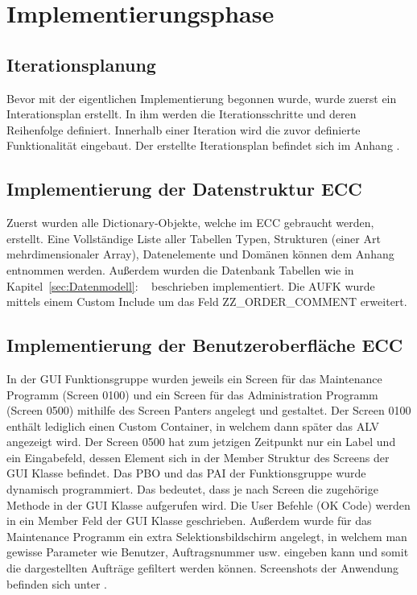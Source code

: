 \section{Implementierungsphase} 
\label{sec:Implementierungsphase}

\subsection{Iterationsplanung}
\label{sec:Iterationsplanung}
Bevor mit der eigentlichen Implementierung begonnen wurde, wurde zuerst ein Interationsplan erstellt. In ihm werden die Iterationsschritte und deren Reihenfolge definiert. Innerhalb einer Iteration wird die zuvor definierte Funktionalität eingebaut. Der erstellte Iterationsplan befindet sich im Anhang .

\subsection{Implementierung der Datenstruktur ECC}
\label{sec:Implementierung der Datenstruktur ECC}
Zuerst wurden alle Dictionary-Objekte, welche im \ac{ECC} gebraucht werden, erstellt. Eine Vollständige Liste aller Tabellen Typen, Strukturen (einer Art mehrdimensionaler Array), Datenelemente und Domänen können dem Anhang entnommen werden. Außerdem wurden die Datenbank Tabellen wie in Kapitel~\ref{sec:Datenmodell}: ~ beschrieben implementiert. Die AUFK wurde mittels einem Custom Include um das Feld ZZ\_ORDER\_COMMENT erweitert.

\subsection{Implementierung der Benutzeroberfläche ECC}
\label{sec:Implementierung der Benutzeroberfläche ECC}
In der \ac{GUI} Funktionsgruppe wurden jeweils ein Screen für das Maintenance Programm (Screen 0100) und ein Screen für das Administration Programm (Screen 0500) mithilfe des Screen Panters angelegt und gestaltet. Der Screen 0100 enthält lediglich einen Custom Container, in welchem dann später das \ac{ALV} angezeigt wird. Der Screen 0500 hat zum jetzigen Zeitpunkt nur ein Label und ein Eingabefeld, dessen Element sich in der Member Struktur des Screens der \ac{GUI} Klasse befindet. Das \ac{PBO} und das \ac{PAI} der Funktionsgruppe wurde dynamisch programmiert. Das bedeutet, dass je nach Screen die zugehörige Methode in der \ac{GUI} Klasse aufgerufen wird. Die User Befehle (OK Code) werden in ein Member Feld der \ac{GUI} Klasse geschrieben. Außerdem wurde für das Maintenance Programm ein extra Selektionsbildschirm angelegt, in welchem man gewisse Parameter wie Benutzer, Auftragsnummer usw. eingeben kann und somit die dargestellten Aufträge gefiltert werden können. Screenshots der Anwendung befinden sich unter .

